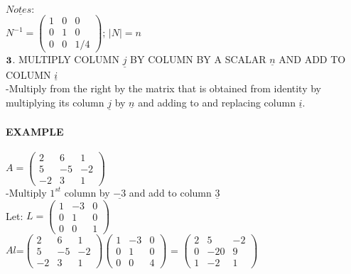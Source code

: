 \documentclass[]{article}
\let\oldparagraph\paragraph
\renewcommand{\paragraph}[1]{\oldparagraph{#1}\mbox{}}
\begin{document}
\(\underline{Notes:}\)\\

\(N^{-1} =\begin{pmatrix} 1 & 0 & 0\\ 0 & 1 & 0 \\ 0 & 0 & 1/4 \end{pmatrix}\);
\(|N|= n\)\\

\(\bold{3}\). MULTIPLY COLUMN \(\underline{j}\) BY COLUMN BY A SCALAR
\(\underline{n}\) AND ADD TO COLUMN \(\underline{i}\)\\

-Multiply from the right by the matrix that is obtained from identity by
multiplying its column \(\underline{j}\) by \(\underline{n}\) and adding
to and replacing column \(\underline{i}\).\\

\paragraph{\texorpdfstring{EXAMPLE\\
}{EXAMPLE }}\label{example-10}

\(A =\begin{pmatrix} 2 & 6 & 1\\ 5 & -5 & -2 \\ -2 & 3 & 1 \end{pmatrix}\)\\

-Multiply \(1^{st}\) column by \(\underline{-3}\) and add to column
\(\underline{3}\)\\

Let:
\(L =\begin{pmatrix} 1 & -3 & 0\\ 0 & 1 & 0 \\ 0 & 0 & 1 \end{pmatrix}\)\\

\(Al\)=\(\begin{pmatrix} 2 & 6 & 1\\ 5 & -5 & -2 \\ -2 & 3 & 1 \end{pmatrix}\begin{pmatrix} 1 & -3 & 0\\ 0 & 1 & 0 \\ 0 & 0 & 4 \end{pmatrix}\)
=
\(\begin{pmatrix} 2 & 5 & -2\\ 0 & -20 & 9 \\ 1 & -2 & 1 \end{pmatrix}\)\\
\end{document}
